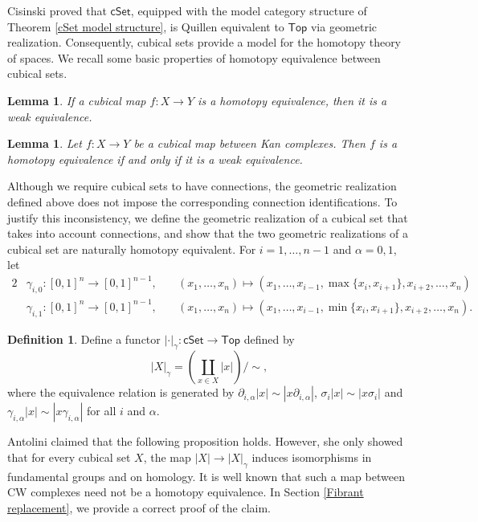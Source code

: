 \documentclass[oneside, 12pt]{amsart}
\numberwithin{equation}{section}
\theoremstyle{plain}
\newtheorem{lemma}[theorem]{Lemma}
\theoremstyle{definition}
\newtheorem{definition}[theorem]{Definition}
\theoremstyle{remark}
\newcommand{\cSet}{\mathsf{cSet}}
\begin{document}
	
	
	Cisinski \cite{C} proved that $\cSet$, equipped with the model category structure of Theorem \ref{cSet model structure}, is Quillen equivalent to $\mathsf{Top}$ via geometric realization. Consequently, cubical sets provide a model for the homotopy theory of spaces. We recall some basic properties of homotopy equivalence between cubical sets.
	\begin{lemma}
			\label{he is we}
			If a cubical map $f\colon X\to Y$ is a homotopy equivalence, then it is a weak equivalence.
	\end{lemma}
	\begin{lemma}
	\label{he vs we}
	Let $f\colon X\to Y$ be a cubical map between Kan complexes. Then $f$ is a homotopy equivalence if and only if it is a weak equivalence.
	\end{lemma}
	
	
	Although we require cubical sets to have connections, the geometric realization defined above does not impose the corresponding connection identifications. To justify this inconsistency, we define the geometric realization of a cubical set that takes into account connections, and show that the two geometric realizations of a cubical set are naturally homotopy equivalent. For $i=1,\ldots,n-1$ and $\alpha=0,1$, let
	\begin{alignat*}{2}
		&\gamma_{i,0}\colon[0,1]^n\to[0,1]^{n-1},\quad&(x_1,\ldots,x_{n})\mapsto(x_1,\ldots,x_{i-1},\max\{x_i,x_{i+1}\},x_{i+2},\ldots,x_n)\\
		&\gamma_{i,1}\colon[0,1]^n\to[0,1]^{n-1},\quad&(x_1,\ldots,x_{n})\mapsto(x_1,\ldots,x_{i-1},\min\{x_i,x_{i+1}\},x_{i+2},\ldots,x_n).
	\end{alignat*}
	
	
	
	\begin{definition}
		Define a functor $|\cdot|_\gamma\colon\cSet\to\mathsf{Top}$ defined by
		\[
		|X|_\gamma=\left(\coprod_{x\in X}|x|\right)/\sim,
		\]
		where the equivalence relation is generated by $\partial_{i,\alpha}|x|\sim|x\partial_{i,\alpha}|$, $\sigma_i|x|\sim|x\sigma_i|$ and $\gamma_{i,\alpha}|x|\sim|x\gamma_{i,\alpha}|$ for all $i$ and $\alpha$.
	\end{definition}
	
	
	
	Antolini \cite{A} claimed that the following proposition holds. However, she only showed that for every cubical set $X$, the map $|X|\to|X|_\gamma$ induces isomorphisms in fundamental groups and on homology. It is well known that such a map between CW complexes need not be a homotopy equivalence. In Section \ref{Fibrant replacement}, we provide a correct proof of the claim.
	
\end{document}
